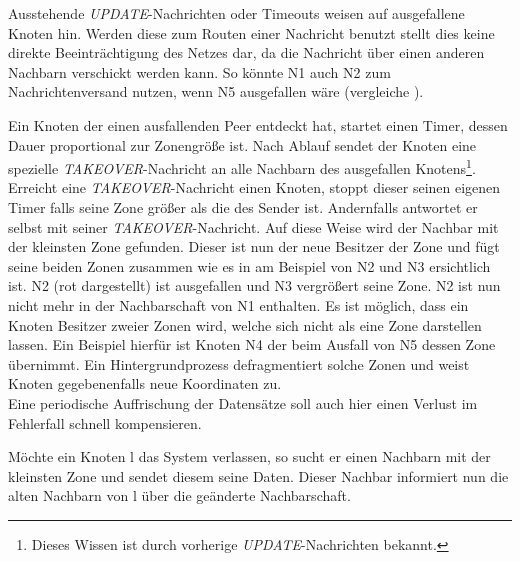 Ausstehende \emph{UPDATE}-Nachrichten oder Timeouts weisen auf ausgefallene Knoten hin. Werden diese zum Routen einer Nachricht benutzt stellt dies keine direkte Beeinträchtigung des Netzes dar, da die Nachricht über einen anderen Nachbarn verschickt werden kann. So könnte N1 auch N2 zum Nachrichtenversand nutzen, wenn N5 ausgefallen wäre (vergleiche ).

Ein Knoten der einen ausfallenden Peer entdeckt hat, startet einen Timer, dessen Dauer proportional zur Zonengröße ist. Nach Ablauf sendet der Knoten eine spezielle \emph{TAKEOVER}-Nachricht an alle Nachbarn des ausgefallen Knotens\footnote{Dieses Wissen ist durch vorherige \emph{UPDATE}-Nachrichten bekannt.}. Erreicht eine \emph{TAKEOVER}-Nachricht einen Knoten, stoppt dieser seinen eigenen Timer falls seine Zone größer als die des Sender ist. Andernfalls antwortet er selbst mit seiner \emph{TAKEOVER}-Nachricht. Auf diese Weise wird der Nachbar mit der kleinsten Zone gefunden. Dieser ist nun der neue Besitzer der Zone und fügt seine beiden Zonen zusammen wie es in  am Beispiel von N2 und N3 ersichtlich ist. N2 (rot dargestellt) ist ausgefallen und N3 vergrößert seine Zone. N2 ist nun nicht mehr in der Nachbarschaft von N1 enthalten. Es ist möglich, dass ein Knoten Besitzer zweier Zonen wird, welche sich nicht als eine Zone darstellen lassen. Ein Beispiel hierfür ist Knoten N4 der beim Ausfall von N5 dessen Zone übernimmt. Ein Hintergrundprozess defragmentiert solche Zonen und weist Knoten gegebenenfalls neue Koordinaten zu.\\
Eine periodische Auffrischung der Datensätze soll auch hier einen Verlust im Fehlerfall schnell kompensieren.

Möchte ein Knoten l das System verlassen, so sucht er einen Nachbarn mit der kleinsten Zone und sendet diesem seine Daten. Dieser Nachbar informiert nun die alten Nachbarn von l über die geänderte Nachbarschaft.

